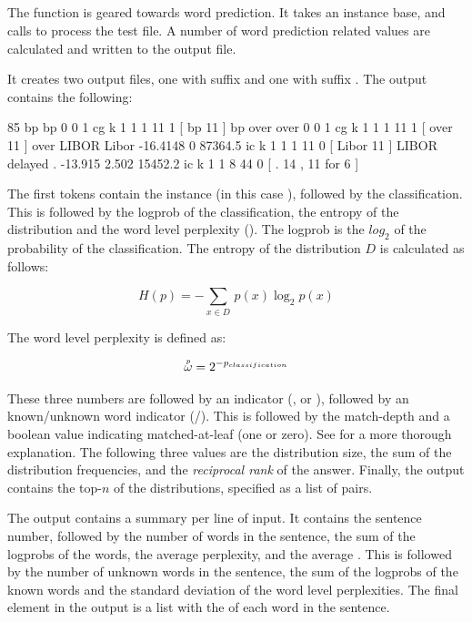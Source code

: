 \documentclass[a4paper,10pt,twoside]{report}
\begin{document}
\subsection{}

The  function is geared towards word prediction. It takes
an instance base, and calls \Timbl{} to process the test file. A
number of word prediction related values are calculated and written to
the output file.

It creates two output files, one with suffix  and one with
suffix .  The  output contains the following:

\begin{wout}{}
85 bp bp 0 0 1 cg k 1 1 1 11 1 [ bp 11 ]
bp over over 0 0 1 cg k 1 1 1 11 1 [ over 11 ]
over LIBOR Libor -16.4148 0 87364.5 ic k 1 1 1 11 0 [ Libor 11 ]
LIBOR delayed . -13.915 2.502 15452.2 ic k 1 1 8 44 0 [ . 14 , 11 for 6 ]
\end{wout}

The first tokens contain the instance (in this case ),
followed by the classification. This is followed by the logprob of the
classification, the entropy of the distribution and the word level
perplexity (\wlp{}). The logprob is the $log_2$ of the probability of the
classification. The entropy of the distribution $D$ is calculated as
follows:

\begin{equation}
H(p) = -\sum_{x \in D} \, p(x)\log_2 p(x)
\label{eq:entropy}
\end{equation}

The word level perplexity is defined as:

\begin{equation}
\accentset{p}{\omega}{} = 2^{-p_{classification}}
\label{eq:wlp}
\end{equation}

These three numbers are followed by an indicator (, 
or ), followed by an known/unknown word indicator
(/). This is followed by the match-depth and a boolean
value indicating matched-at-leaf (one or zero). See
\cite{Daelemans+09} for a more thorough explanation. The following
three values are the distribution size, the sum of the distribution
frequencies, and the \emph{reciprocal rank} of the answer. Finally,
the output contains the top-$n$ of the distributions, specified as a
list of  pairs.

The  output contains a summary per line of input. It
contains the sentence number, followed by the number of words in the
sentence, the sum of the logprobs of the words, the average
perplexity, and the average \wlp{}. This is followed by
the number of unknown words in the sentence, the sum of the logprobs
of the known words and the standard deviation of the word level
perplexities. The final element in the output is a list with the
\wlp{} of each word in the sentence.
\end{document}
